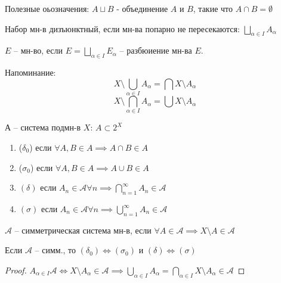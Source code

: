 Полезные оьозначения: $A \sqcup B$ - объединение $A$ и $B$, такие что $A \cap B = \emptyset$

\begin{definition}
    Набор мн-в дизъюнктный, если мн-ва попарно не пересекаются: $\bigsqcup_{\alpha \in I}A_{\alpha}$
\end{definition}

\begin{definition}
    $E$ -- мн-во, если $E = \bigsqcup_{\alpha \in I} E_{\alpha}$ -- разбюиение мн-ва $E$.
\end{definition}

Напоминание:
$$X \setminus \bigcup_{\alpha \in I} A_{\alpha} = \bigcap X \setminus A_{\alpha}$$
$$X \setminus \bigcap_{\alpha \in I} A_{\alpha} = \bigcup X \setminus A_{\alpha}$$


\begin{definition}
    $\mathcal{А}$ -- система подмн-в $X$: $A \subset 2^{X}$

    \begin{enumerate}
        \item ($\delta_0$) если $\forall A, B \in A \implies A \cap B \in A$
        \item ($\sigma_0$) если $\forall A, B \in A \implies A \cup B \in A$
        \item {
            $(\delta)$ если $A_n \in \mathcal{A} \forall n \implies \bigcap_{n=1}^{\infty} A_n \in \mathcal{A}$
        }
        \item {
            $(\sigma)$ если $A_n \in \mathcal{A} \forall n \implies \bigcup_{n=1}^{\infty} A_n \in \mathcal{A}$
        }
    \end{enumerate}
\end{definition}

\begin{definition}
    $\mathcal{A}$ -- симметрическая система мн-в, если $\forall A \in \mathcal{A} \implies X \setminus A \in \mathcal{A}$ 
\end{definition}

\begin{statement}
    Если $\mathcal{A}$ -- симм., то $(\delta_{0}) \Leftrightarrow (\sigma_{0})$ и $(\delta) \Leftrightarrow (\sigma)$
\end{statement}

\begin{proof}
    $A_{\alpha \in I}\mathcal{A} \Leftrightarrow X \setminus A_{\alpha} \in \mathcal{A} \implies \bigcup_{\alpha \in I}A_{\alpha} = \bigcap_{\alpha \in I} X \setminus A_{\alpha} \in \mathcal{A}$
\end{proof}

